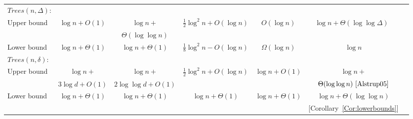 \begin{table}[!ht]
{\begin{tabular*}{17cm}{@{\extracolsep{\fill}}lcccccc}
			 
			 
				
			$Trees(n,\Delta)$:&&&&&&\\
			Upper bound 	&$\log n +O(1)$ 				  	  &$\log n +$ 			 &$\frac{1}{2}\log^2 n +O(\log n)$  \cite{Gavoille2001}		&$ O(\log n)$\cite{Alstrup02NCA} 		&$\log n + \Theta(\log \log \Delta)$~\cite{Alstrup05}	\\ 
						&								&$\Theta(\log \log n)$ \cite{Korman10} \\\hdashline
			Lower bound 	&$\log n + \Theta(1)$						        &$\log n + \Theta(1)$						 &$\frac{1}{8}\log^2 n-O(\log n)$ \cite{Gavoille2001} 		&$ \Omega(\log n)$\cite{Alstrup02NCA}	&$\log n$			\\ \hline 
			
			
			
			$Trees(n,\delta)$:&&&&&&\\
			Upper bound & \cite{Fraigniaud10}$\log n + $ 				  	    &$\log n + $ 							 &$\frac{1}{2}\log^2 n +O(\log n)$ 						&$\log n +O(1)$ 	&$\log n+ $	\\ 
						&$3 \log d +O(1)$   &$2 \log \log d +O(1)$\cite{Fraigniaud10}	&						&				&$ \Theta(\log \log n)~\cite{Alstrup05}$\\	\hdashline				
			Lower  bound & $\log n + \Theta(1)$						    &	$\log n + \Theta(1)$							 &$\log n + \Theta(1)$					&$\log n + \Theta(1)$			&$\log n + \Theta(\log \log n) $  \\ 
			&&&&&[Corollary~\ref{Cor:lowerbounds}]			 	\\ \hline						
  \end{tabular*}\par\medskip
 }
\label{tab:priors}
 \label{Table2}
\end{table}
	
		